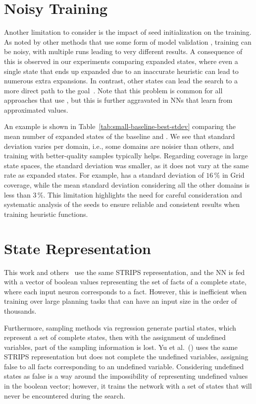 \section{Noisy Training}

Another limitation to consider is the impact of seed initialization on the training. As noted by other methods that use some form of model validation \cite{Ferber.etal/2020a, Shen.etal/2020, Ferber.etal/2022, OToole/2022}, training can be noisy, with multiple runs leading to very different results. A consequence of this is observed in our experiments comparing expanded states, where even a single state that ends up expanded due to an inaccurate heuristic can lead to numerous extra expansions. In contrast, other states can lead the search to a more direct path to the goal~\cite{Heusner.etal/2017}. Note that this problem is common for all approaches that use \gbfs, but this is further aggravated in NNs that learn from approximated values.



An example is shown in Table~\ref{tab:small-baseline-best-stdev} comparing the mean number of expanded states of the baseline and \hnnrs. We see that standard deviation varies per domain, i.e., some domains are noisier than others, and training with better-quality samples typically helps. Regarding coverage in large state spaces, the standard deviation was smaller, as it does not vary at the same rate as expanded states. For example, \hnnrs has a standard deviation of $16\,\%$ in Grid coverage, while the mean standard deviation considering all the other domains is less than $3\,\%$. This limitation highlights the need for careful consideration and systematic analysis of the seeds to ensure reliable and consistent results when training heuristic functions.

\section{State Representation}

This work and others~\cite{Ferber.etal/2020a, Ferber.etal/2022, OToole/2022} use the same STRIPS representation, and the NN is fed with a vector of boolean values representing the set of facts of a complete state, where each input neuron corresponds to a fact. However, this is inefficient when training over large planning tasks that can have an input size in the order of thousands.

Furthermore, sampling methods via regression generate partial states, which represent a set of complete states, then with the assignment of undefined variables, part of the sampling information is lost. Yu et al.~(\citeyear{Yu.etal/2020}) uses the same STRIPS representation but does not complete the undefined variables, assigning false to all facts corresponding to an undefined variable. Considering undefined states as false is a way around the impossibility of representing undefined values in the boolean vector; however, it trains the network with a set of states that will never be encountered during the search.

